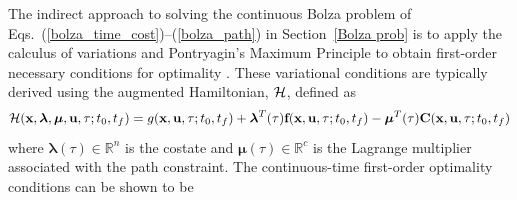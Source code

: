 \documentclass[10pt,final]{report}
\begin{document}
The indirect approach to solving the continuous Bolza problem of
Eqs.~(\ref{bolza_time_cost})--(\ref{bolza_path}) in
Section~\ref{Bolza prob} is to apply the calculus of variations and
Pontryagin's Maximum Principle \cite{Pontryagin1} to obtain
first-order necessary conditions for optimality \cite{Kirk1}.   These
variational conditions are typically derived using the augmented
Hamiltonian, ${\cal H}$, defined as
\begin{equation}
{\cal
  H}(\textbf{x},\boldsymbol{\lambda},\boldsymbol{\mu},\textbf{u},\tau;t_0,t_f)
  = g(\textbf{x},\textbf{u},\tau;t_0,t_f) +
  \boldsymbol{\lambda}^T(\tau)\textbf{f}(\textbf{x},\textbf{u},\tau;t_0,t_f)
  - \boldsymbol{\mu}^T(\tau)  \textbf{C}(\textbf{x},\textbf{u},\tau;t_0,t_f)
\end{equation}
where $\boldsymbol{\lambda}(\tau) \in\mathbb{R}^n$ is the costate and
$\boldsymbol{\mu}(\tau) \in\mathbb{R}^c$ is the Lagrange multiplier
associated with the path constraint.  The continuous-time first-order
optimality conditions can be shown to be
\end{document}

